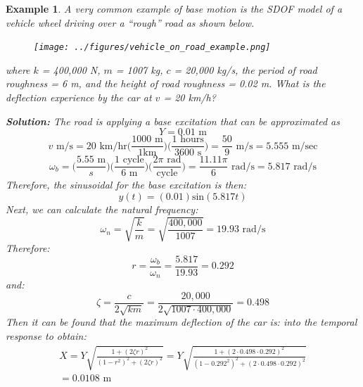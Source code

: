 \documentclass[12pt,letter]{article}
\newtheorem{ex}{Example}
\numberwithin{ex}{section} %
\newenvironment{example}{\begin{mdframed}[middlelinewidth=0.5mm]\begin{ex}\normalfont}{\end{ex}\end{mdframed}}
\numberwithin{re}{section} %
\begin{document}
				\begin{example}
	
					A very common example of base motion is the SDOF model of a vehicle wheel driving over a ``rough'' road as shown below. 
					\begin{figure}[H]
						\centering
						\texttt{[image: ../figures/vehicle\_on\_road\_example.png]}
					\end{figure}				
					\noindent where $k$ = 400,000 N, $m$ = 1007 kg, $c$ = 20,000 kg/s, the period of road roughness = 6 m, and the height of road roughness = 0.02 m. What is the deflection experience by the car at $v$ = 20 km/h?
					
					\noindent\textbf{Solution:} The road is applying a base excitation that can be approximated as 
					\begin{equation}
						Y = 0.01 \text{ m}
					\end{equation} 				
					\begin{equation}
						v \text{ m/s} = 20 \text{ km/hr}\Bigg(\frac{1000 \text{ m}}{1 \text {km}}\Bigg) \Bigg(\frac{1 \text{ hours}}{3600 \text { s}}\Bigg) = \frac{50}{9} \text{ m/s} = 5.555 \text{ m/sec}
					\end{equation} 	
					\begin{equation}
						\omega_b = \Bigg(\frac{ 5.55 \text{ m}}{s}\Bigg) \Bigg(\frac{ 1 \text{ cycle}}{6 \text{ m}}\Bigg) \Bigg(\frac{ 2 \pi \text{ rad}}{\text {cycle}}\Bigg) = \frac{ 11.11 \pi }{6 } \text{ rad/s} =5.817 \text{ rad/s} 
					\end{equation} 	
					Therefore, the sinusoidal for the base excitation is then:
					\begin{equation}
						y(t) = (0.01) \text{sin}(5.817 t)
					\end{equation} 	
					Next, we can calculate the natural frequency:
					\begin{equation}
						\omega_n = \sqrt{\frac{k}{m}} = \sqrt{\frac{400,000}{1007}} = 19.93 \text{ rad/s}
					\end{equation} 			
					Therefore:
					\begin{equation}
					r=\frac{\omega_b}{\omega_n} = \frac{5.817}{19.93} =0.292
					\end{equation} 		
					and:
					\begin{equation}
					\zeta = \frac{c}{2\sqrt{km}}= \frac{20,000}{2\sqrt{1007\cdot400,000}} = 0.498
					\end{equation}	
					Then it can be found that the maximum deflection of the car is:
					into the temporal response to obtain:
					\begin{equation}
					\begin{split}
					X = Y \sqrt{\frac{1+(2 \zeta r)^2}{(1-r^2)^2 + (2 \zeta r )^2}} = Y \sqrt{\frac{1+(2 \cdot 0.498 \cdot 0.292)^2}{(1-0.292^2)^2 + (2 \cdot 0.498 \cdot 0.292 )^2}}  \\ = 0.0108 \text{ m}
					\end{split}
					\end{equation} 		
				\end{example}	
					
\end{document}
